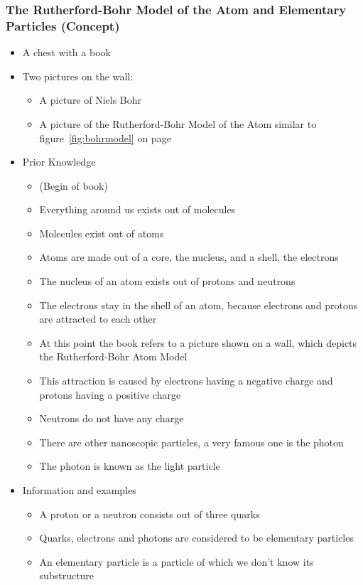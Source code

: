 \documentclass[11pt,twoside]{report} %
\begin{document}
\subsubsection{The Rutherford-Bohr Model of the Atom and Elementary Particles (Concept)}
	\begin{itemize}
		\item A chest with a book
		\item Two pictures on the wall:
		\begin{itemize}
			\item A picture of Niels Bohr
			\item A picture of the Rutherford-Bohr Model of the Atom similar to figure~\ref{fig:bohrmodel} on page~\pageref{fig:bohrmodel}
		\end{itemize}
		\item Prior Knowledge
		\begin{itemize}
			\item (Begin of book)
			\item Everything around us exists out of molecules
			\item Molecules exist out of atoms
			\item Atoms are made out of a core, the nucleus, and a shell, the electrons
			\item The nucleus of an atom exists out of protons and neutrons
			\item The electrons stay in the shell of an atom, because electrons and protons are attracted to each other
			\item At this point the book refers to a picture shown on a wall, which depicts the Rutherford-Bohr Atom Model
			\item This attraction is caused by electrons having a negative charge and protons having a positive charge
			\item Neutrons do not have any charge
			\item There are other nanoscopic particles, a very famous one is the photon
			\item The photon is known as the light particle
		\end{itemize}
		\item Information and examples
		\begin{itemize}
			\item A proton or a neutron consists out of three quarks
			\item Quarks, electrons and photons are considered to be elementary particles
			\item An elementary particle is a particle of which we don’t know its substructure

\end{itemize}
\end{itemize}
\end{document}
